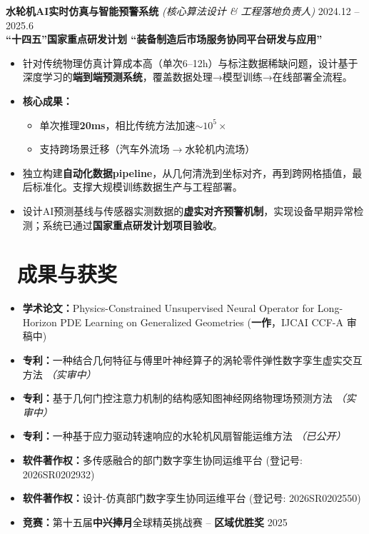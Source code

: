 \documentclass[11pt]{article}
\begin{document}
\textbf{水轮机AI实时仿真与智能预警系统} 
\textit{(核心算法设计 \& 工程落地负责人)} \hfill 2024.12 -- 2025.6\\[0.2em]
\textcolor{CVBlue}{\textbf{``十四五''国家重点研发计划
``装备制造后市场服务协同平台研发与应用''}}
\begin{itemize}
    \item 针对传统物理仿真计算成本高（单次6--12h）与标注数据稀缺问题，设计基于深度学习的\textbf{端到端预测系统}，覆盖数据处理→模型训练→在线部署全流程。
    \item \textbf{核心成果：}
    \begin{itemize}
        \item 单次推理\textbf{20ms}，相比传统方法加速$\sim 10^5\times$
        \item 支持跨场景迁移（汽车外流场$\rightarrow$水轮机内流场）
    \end{itemize}
    \item 独立构建\textbf{自动化数据pipeline}，从几何清洗到坐标对齐，再到跨网格插值，最后标准化。支撑大规模训练数据生产与工程部署。
    \item 设计AI预测基线与传感器实测数据的\textbf{虚实对齐预警机制}，实现设备早期异常检测；系统已通过\textbf{国家重点研发计划项目验收}。
\end{itemize}


\section{%
    \makebox[\widthof{\faTrophy}][c]%
    {\color{CVBlue}\faTrophy}\ 成果与获奖%
}

\begin{itemize}
    \item \textbf{学术论文：}Physics-Constrained Unsupervised Neural Operator for Long-Horizon PDE Learning on Generalized Geometries (\textbf{一作}，IJCAI CCF-A 审稿中)
    \item \textbf{专利：}一种结合几何特征与傅里叶神经算子的涡轮零件弹性数字孪生虚实交互方法 \textit{（实审中）}
    \item \textbf{专利：}基于几何门控注意力机制的结构感知图神经网络物理场预测方法 \textit{（实审中）}
    \item \textbf{专利：}一种基于应力驱动转速响应的水轮机风扇智能运维方法 \textit{（已公开）}
    \item \textbf{软件著作权：}多传感融合的部门数字孪生协同运维平台 (登记号: 2026SR0202932)
    \item \textbf{软件著作权：}设计-仿真部门数字孪生协同运维平台 (登记号: 2026SR0202550)
    \item \textbf{竞赛：}第十五届\textbf{中兴捧月}全球精英挑战赛 -- \textbf{区域优胜奖} \hfill 2025
\end{itemize}
\end{document}
